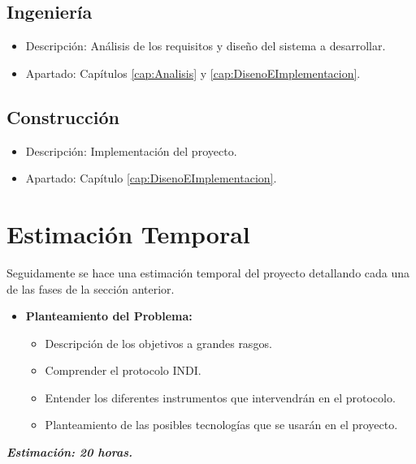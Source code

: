 \subsection{Ingeniería}
\begin{itemize}
  \item Descripción: Análisis de los requisitos y diseño del sistema a desarrollar.
  \item Apartado: Capítulos \ref{cap:Analisis} y \ref{cap:DisenoEImplementacion}.\\
\end{itemize}

\subsection{Construcción}
\begin{itemize}
  \item Descripción: Implementación del proyecto.
  \item Apartado: Capítulo \ref{cap:DisenoEImplementacion}.\\
\end{itemize}


\section{Estimación Temporal}
Seguidamente se hace una estimación temporal del proyecto detallando cada una de las fases de la sección anterior.

\begin{itemize}
  \item \textbf{Planteamiento del Problema:}
  \begin{itemize}
    \item Descripción de los objetivos a grandes rasgos.
    \item Comprender el protocolo INDI.
    \item Entender los diferentes instrumentos que intervendrán en el protocolo.
    \item Planteamiento de las posibles tecnologías que se usarán en el proyecto.
  \end{itemize}
\end{itemize}
\textit{\textbf{Estimación: 20 horas.}}\\ \\

